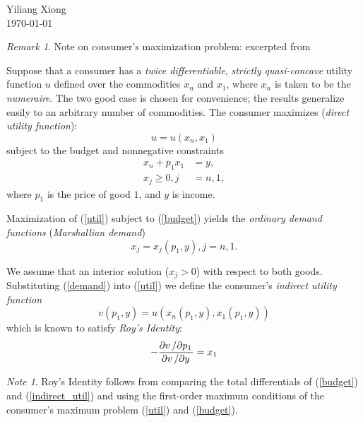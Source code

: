 \documentclass[12pt,a4paper]{article}
\theoremstyle{plain}%
\theoremstyle{definition}
\theoremstyle{remark}
\newtheorem*{rem}{Remark}
\newtheorem*{note}{Note}
\begin{document}
\begin{flushright}
\linespread{1}	%
\small \normalsize %
Yiliang Xiong \\
\today
\end{flushright}


\begin{rem}
Note on consumer's maximization problem: excerpted from 
\end{rem}

Suppose that a consumer has a \emph{twice differentiable}, \emph{strictly quasi-concave} 
utility function $u$ defined over the commodities $x_n$ and $x_1$, where $x_n$ is taken to 
be the \emph{numeraire}. The two good case is chosen for convenience; the results generalize 
easily to an arbitrary number of commodities. The consumer maximizes (\emph{direct utility
function}): 
\begin{equation}\label{util}
	u = u(x_n, x_1)	
\end{equation}
subject to the budget and nonnegative constraints 
\begin{align} 
	\label{budget}
	x_n + p_1 x_1 &= y, \\
	x_j \geq 0, j &= n,1,	
\end{align}
where $p_1$ is the price of good $1$, and $y$ is income. 

Maximization of (\ref{util}) subject to (\ref{budget}) yields the \emph{ordinary demand functions} 
(\emph{Marshallian demand})
\begin{equation} \label{demand}
	x_j = x_j(p_1, y), j = n,1. 
\end{equation}

We assume that an interior solution ($x_j>0$) with respect to both goods. Substituting 
(\ref{demand}) into (\ref{util}) we define the consumer's \emph{indirect utility function} 
\begin{equation} \label{indirect_util}
	v(p_1, y) = u(x_n(p_1,y), x_1(p_1,y))
\end{equation}
which is known to satisfy \emph{Roy's Identity}: 
\begin{equation} \label{roy}
	-\frac{\partial v \left/ \partial p_1 \right. }%
		  {\partial v \left/ \partial y \right. } = x_1
\end{equation}

\begin{note}
	Roy's Identity follows from comparing the total differentials of (\ref{budget}) 
	and (\ref{indirect_util}) and using the first-order maximum conditions of the consumer's 
	maximum problem (\ref{util}) and (\ref{budget}).
\end{note}
\end{document}
